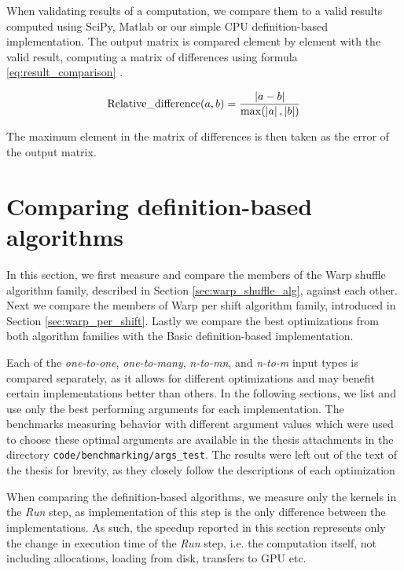 When validating results of a computation, we compare them to a valid results computed using SciPy, Matlab or our simple CPU definition-based implementation. The output matrix is compared element by element with the valid result, computing a matrix of differences using formula \ref{eq:result_comparison} \citep{wiki:relative_difference}.

\begin{equation}
\label{eq:result_comparison}
\mathrm{Relative\_difference }(a, b) = \frac{\left|{a - b}\right|}{\max(\left|{a}\right|, \left|{b}\right|)}
\end{equation}

The maximum element in the matrix of differences is then taken as the error of the output matrix.

\section{Comparing definition-based algorithms}
\label{sec:results_definition_based}

In this section, we first measure and compare the members of the Warp shuffle algorithm family, described in Section \ref{sec:warp_shuffle_alg}, against each other. Next we compare the members of Warp per shift algorithm family, introduced in Section \ref{sec:warp_per_shift}. Lastly we compare the best optimizations from both algorithm families with the Basic definition-based implementation.


Each of the \textit{one-to-one}, \textit{one-to-many}, \textit{n-to-mn}, and \textit{n-to-m} input types is compared separately, as it allows for different optimizations and may benefit certain implementations better than others. In the following sections, we list and use only the best performing arguments for each implementation. The benchmarks measuring behavior with different argument values which were used to choose these optimal arguments are available in the thesis attachments in the directory \texttt{code/benchmarking/args\_test}. The results were left out of the text of the thesis for brevity, as they closely follow the descriptions of each optimization 

When comparing the definition-based algorithms, we measure only the kernels in the \textit{Run} step, as implementation of this step is the only difference between the implementations. As such, the speedup reported in this section represents only the change in execution time of the \textit{Run} step, i.e. the computation itself, not including allocations, loading from disk, transfers to GPU etc.


